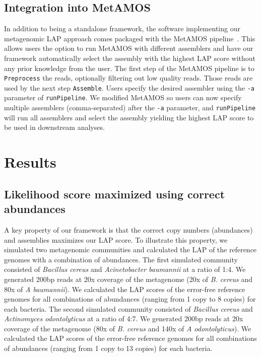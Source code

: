 \documentclass[12pt,\mydriver]{thesis}
\begin{document}
\subsection{Integration into MetAMOS}

In addition to being a standalone framework, the software implementing our metagenomic LAP approach comes packaged with the MetAMOS pipeline~\cite{koren2014automated}.
This allows users the option to run MetAMOS with different assemblers and have our framework automatically select the assembly with the highest LAP score without any prior knowledge from the user.
The first step of the MetAMOS pipeline is to \verb!Preprocess! the reads, optionally filtering out low quality reads.
Those reads are used by the next step \verb!Assemble!.
Users specify the desired assembler using the \verb!-a! parameter of \verb!runPipeline!.
We modified MetAMOS so users can now specify multiple assemblers (comma-separated) after the \verb!-a! parameter, and \verb!runPipeline! will run all assemblers and select the assembly yielding the highest LAP score to be used in downstream analyses.



\section{Results}
\subsection{Likelihood score maximized using correct abundances}
A key property of our framework is that the correct copy numbers (abundances) and assemblies maximizes our LAP score.
To illustrate this property, we simulated two metagenomic communities and calculated the LAP of the reference genomes with a combination of abundances.
The first simulated community consisted of \emph{Bacillus cereus} and \emph{Acinetobacter baumannii} at a ratio of 1:4.
We generated 200bp reads at 20x coverage of the metagenome (20x of \emph{B. cereus} and 80x of \emph{A baumannii}).
We calculated the LAP scores of the error-free reference genomes for all combinations of abundances (ranging from 1 copy to 8 copies) for each bacteria.
The second simulated community consisted of \emph{Bacillus cereus} and \emph{Actinomyces odontolyticus} at a ratio of 4:7.
We generated 200bp reads at 20x coverage of the metagenome (80x of \emph{B. cereus} and 140x of \emph{A odontolyticus}).
We calculated the LAP scores of the error-free reference genomes for all combinations of abundances (ranging from 1 copy to 13 copies) for each bacteria.
\end{document}
